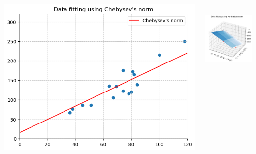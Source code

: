 \documentclass[presentation.tex]{subfiles}
\begin{document}
\begin{frame}[fragile]
        \begin{columns}
            \begin{column}{0.5\textwidth}
                \includegraphics[width=1\linewidth]{2D_viz.png}
            \end{column}
            \begin{column}{0.5\textwidth}
                \includegraphics[height=140, width=0.9\linewidth]{3D_viz.png}
            \end{column}
        \end{columns}
    \end{frame}
\end{document}
